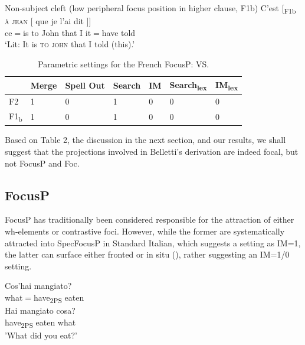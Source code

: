 \documentclass[fleqn,10pt]{wlscirep}
\begin{document}
\begin{exe}
    \ex	Non-subject cleft (low peripheral focus position in higher clause, F1b)
        \gll {[} C'est {[}\textsubscript{F1b} \textsc{à} \textsc{jean} {[} que je l'ai dit {]]}\\
        {} ce$=$is 		{}	to John			{}		that I it$=$have told {} \\
        \vspace*{-3mm}
        \glt ‘Lit: It is \textsc{to john} that I told (this).’
\end{exe}


\begin{table}[H]
    \centering
    \begin{tabular}{|l|l|l|l|l|l|l|}
    \hline
    & Merge & Spell Out & Search & IM & Search\textsubscript{lex} & IM\textsubscript{lex} \\
    \hline
    F2 & 1 & 0 & 1 & 0 & 0 & 0 \\
    \hline
    F1\textsubscript{b} & 1 & 0 & 1 & 0 & 0 & 0 \\
    \hline
    \end{tabular}
    \caption{\label{tab:belletti}Parametric settings for the French FocusP: VS.}
\end{table}

\noindent Based on Table 2, the discussion in the next section, and our results, we shall suggest that the projections involved in Belletti's derivation are indeed focal, but not FocusP and Foc.

\subsection*{FocusP}

FocusP has traditionally been considered responsible for the attraction of either wh-elements or contrastive foci. 
However, while the former are systematically attracted into SpecFocusP in Standard Italian, which suggests a setting as IM=1, the latter can surface either fronted or in situ (\citealt{bianchi2013}), rather suggesting an IM=1/0 setting. 

\begin{exe}
    \ex
        \begin{xlist}
            \ex \gll Cos'hai mangiato?\\
            what$=$have\textsubscript{2PS} eaten\\
            \ex \gll * Hai mangiato cosa?\\
            {} have\textsubscript{2PS} eaten what\\
            \glt \hspace{2mm} 'What did you eat?'
        \end{xlist}
\end{exe}
\end{document}

